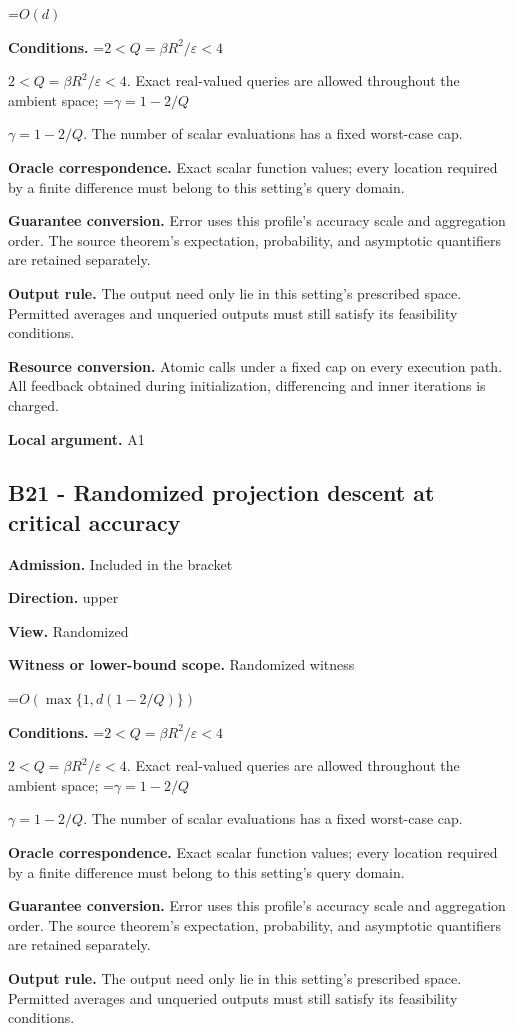 \documentclass[10pt,a4paper]{article}
\newcommand{\AtlasMath}[1]{\par\begingroup\centering\setbox0=\hbox{$\displaystyle #1$}\ifdim\wd0>1.4\linewidth\typeout{ATLAS WIDE FORMULA: \the\wd0}\fi\ifdim\wd0>\linewidth\resizebox{\linewidth}{!}{\box0}\else\box0\fi\par\endgroup}
\newcommand{\AtlasInlineMath}[1]{\begingroup\setbox0=\hbox{$#1$}\ifdim\wd0>.4\linewidth\endgroup\AtlasMath{#1}\else\endgroup$#1$\fi}
\begin{document}
\AtlasMath{O(d)}
\textbf{Conditions.} \AtlasInlineMath{2<Q=\beta R^2/\varepsilon<4}. Exact real-valued queries are allowed throughout the ambient space; \AtlasInlineMath{\gamma=1-2/Q}. The number of scalar evaluations has a fixed worst-case cap.

\textbf{Oracle correspondence.} Exact scalar function values; every location required by a finite difference must belong to this setting's query domain.

\textbf{Guarantee conversion.} Error uses this profile's accuracy scale and aggregation order. The source theorem's expectation, probability, and asymptotic quantifiers are retained separately.

\textbf{Output rule.} The output need only lie in this setting's prescribed space. Permitted averages and unqueried outputs must still satisfy its feasibility conditions.

\textbf{Resource conversion.} Atomic calls under a fixed cap on every execution path. All feedback obtained during initialization, differencing and inner iterations is charged.

\textbf{Local argument.} A1

\subsection{B21 - Randomized projection descent at critical accuracy}
\textbf{Admission.} Included in the bracket

\textbf{Direction.} upper

\textbf{View.} Randomized

\textbf{Witness or lower-bound scope.} Randomized witness

\AtlasMath{O(\max\{1,d(1-2/Q)\})}
\textbf{Conditions.} \AtlasInlineMath{2<Q=\beta R^2/\varepsilon<4}. Exact real-valued queries are allowed throughout the ambient space; \AtlasInlineMath{\gamma=1-2/Q}. The number of scalar evaluations has a fixed worst-case cap.

\textbf{Oracle correspondence.} Exact scalar function values; every location required by a finite difference must belong to this setting's query domain.

\textbf{Guarantee conversion.} Error uses this profile's accuracy scale and aggregation order. The source theorem's expectation, probability, and asymptotic quantifiers are retained separately.

\textbf{Output rule.} The output need only lie in this setting's prescribed space. Permitted averages and unqueried outputs must still satisfy its feasibility conditions.
\end{document}
